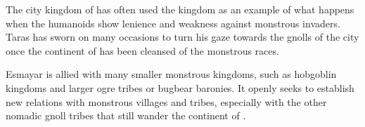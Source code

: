 The city kingdom of  has often used the kingdom as an
example of what happens when the humanoids show lenience and weakness against
monstrous invaders. Taras has sworn on many occasions to turn his gaze towards
the gnolls of the city once the continent of  has been
cleansed of the monstrous races.

Esmayar is allied with many smaller monstrous kingdoms, such as hobgoblin
kingdoms and larger ogre tribes or bugbear baronies. It openly seeks to
establish new relations with monstrous villages and tribes, especially with
the other nomadic gnoll tribes that still wander the continent of
.
